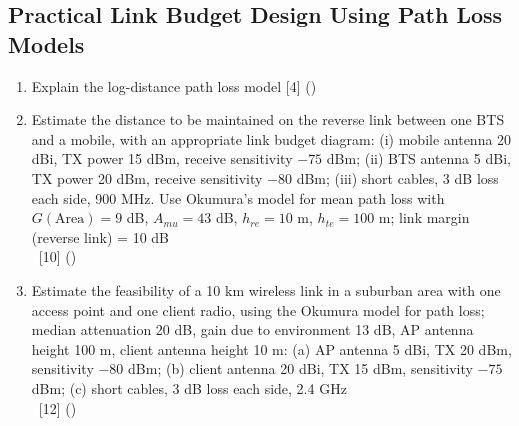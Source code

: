 \documentclass[12pt]{article}
\newcommand{\enter}{\\\textcolor{white}{1}}
\begin{document}
  \subsection{Practical Link Budget Design Using Path Loss Models}
    \begin{enumerate}[topsep=0pt, noitemsep]
      \item Explain the log-distance path loss model \hfill [4] ()
      \item Estimate the distance to be maintained on the reverse link between one BTS and a
        mobile, with an appropriate link budget diagram:
        (i) mobile antenna 20 dBi, TX power 15 dBm, receive sensitivity $-75$ dBm;
        (ii) BTS antenna 5 dBi, TX power 20 dBm, receive sensitivity $-80$ dBm;
        (iii) short cables, 3 dB loss each side, 900 MHz.
        Use Okumura's model for mean path loss with $G(\text{Area}) = 9$ dB, $A_{mu} = 43$ dB,
        $h_{re} = 10$ m, $h_{te} = 100$ m; link margin (reverse link) = 10 dB
        \enter\hfill [10] ()
      \item Estimate the feasibility of a 10 km wireless link in a suburban area with one access
        point and one client radio, using the Okumura model for path loss; median attenuation
        20 dB, gain due to environment 13 dB, AP antenna height 100 m, client antenna height 10 m:
        (a) AP antenna 5 dBi, TX 20 dBm, sensitivity $-80$ dBm;
        (b) client antenna 20 dBi, TX 15 dBm, sensitivity $-75$ dBm;
        (c) short cables, 3 dB loss each side, 2.4 GHz
        \enter\hfill [12] ()
    \end{enumerate}
\end{document}
